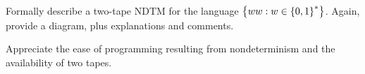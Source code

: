 \begin{problem}
  Formally describe a two-tape NDTM for the language
  $\left\{ ww : w \in \left\{0, 1\right\}^*\right\}$.
  Again, provide a diagram, plus explanations and comments.

  \step
  Appreciate the ease of programming resulting from nondeterminism
  and the availability of two tapes.
\end{problem}
